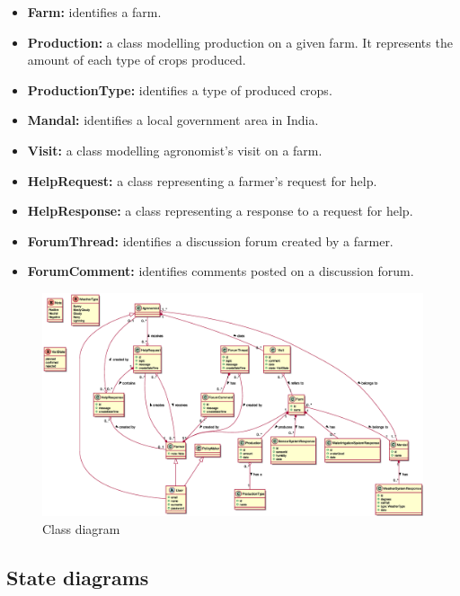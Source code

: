 \begin{itemize}
    \begin{itemize}
        \item \textbf{Farm:} identifies a farm.
        \item \textbf{Production:} a class modelling production on a given farm. It represents the amount of each type of crops produced. 
        \item \textbf{ProductionType:} identifies a type of produced crops.
        \item \textbf{Mandal:} identifies a local government area in India.
        \item \textbf{Visit:} a class modelling agronomist's visit on a farm.
        \item \textbf{HelpRequest:} a class representing a farmer's request for help.
        \item \textbf{HelpResponse:} a class representing a response to a request for help.
        \item \textbf{ForumThread:} identifies a discussion forum created by a farmer.
        \item \textbf{ForumComment:} identifies comments posted on a discussion forum.
    \end{itemize}    
\end{itemize}

\begin{figure}[H]
    \centering
    \includegraphics[width=0.96\textheight, keepaspectratio, origin=c, angle=90]{diagrams/class}
    \caption{Class diagram}
    \label{fig:class_diagram}
\end{figure}

\subsection{State diagrams}

